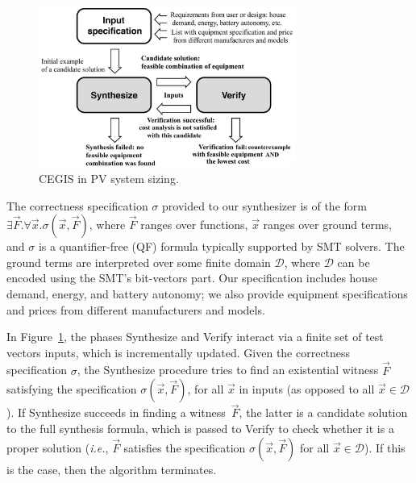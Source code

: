 \documentclass[runningheads]{llncs}
\begin{document}
\begin{figure}[h]
\begin{center}
\includegraphics[width=0.75\textwidth]{fig2_rev2.jpg}
\end{center}
%
	\caption{CEGIS in PV system sizing.}
	\label{Counter-Example-Guided-Inductive-Synthesis}
\end{figure}

The correctness specification $\sigma$ provided to our synthesizer is of the form $\exists \vec{F}. \forall \vec{x}. \sigma(\vec{x}, \vec{F})$, where $\vec{F}$ ranges over functions, $\vec{x}$ ranges over ground terms, and $\sigma$ is a quantifier-free (QF) formula typically supported by SMT solvers. The ground terms are interpreted over some finite domain $\mathcal{D}$, where $\mathcal{D}$ can be encoded using the SMT's bit-vectors part. Our specification includes house demand, energy, and battery autonomy; we also provide equipment specifications and prices from different manufacturers and models.

In Figure~\ref{Counter-Example-Guided-Inductive-Synthesis}, the phases {\sc Synthesize} and {\sc Verify} interact via a finite set of test vectors {\sc inputs}, which is incrementally updated. Given the correctness specification $\sigma$, the {\sc Synthesize} procedure tries to find an existential witness $\vec{F}$ satisfying the specification $\sigma(\vec{x}, \vec{F})$, for all $\vec{x}$ in {\sc inputs} (as opposed to all $\vec{x} \in \mathcal{D}$). If {\sc Synthesize} succeeds in finding a witness~$\vec{F}$, the latter is a candidate solution to the full synthesis formula, which is passed to {\sc Verify} to check whether it is a proper solution ({\it i.e.}, $\vec{F}$ satisfies the specification $\sigma(\vec{x}, \vec{F})$ for all $\vec{x}\in\mathcal{D}$). If this is the case, then the algorithm terminates.
\end{document}

